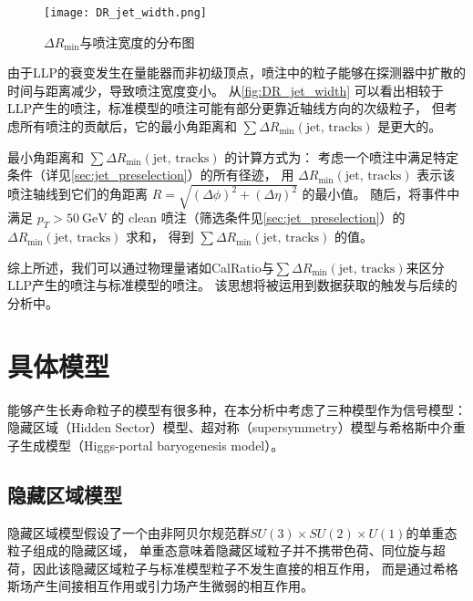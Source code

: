 \begin{figure}[ht]
    \centering
    \texttt{[image: DR\_jet\_width.png]}
    \caption{$\Delta R_{\min}$与喷注宽度的分布图\cite{ATLAS:2022zhj}}
    \label{fig:DR_jet_width}
\end{figure}

由于LLP的衰变发生在量能器而非初级顶点，喷注中的粒子能够在探测器中扩散的时间与距离减少，导致喷注宽度变小。
从\autoref{fig:DR_jet_width} 可以看出相较于LLP产生的喷注，标准模型的喷注可能有部分更靠近轴线方向的次级粒子，
但考虑所有喷注的贡献后，它的最小角距离和 $\sum \Delta R_{\text{min}}(\text{jet, tracks})$ 是更大的。

最小角距离和 $\sum \Delta R_{\text{min}}(\text{jet, tracks})$ 的计算方式为：
考虑一个喷注中满足特定条件（详见\autoref{sec:jet_preselection}）的所有径迹，
用 $\Delta R_{\text{min}}(\text{jet, tracks})$ 表示该喷注轴线到它们的角距离
$R = \sqrt{(\Delta \phi)^2 + (\Delta \eta)^2}$ 的最小值。
随后，将事件中满足 \(p_T > 50~\text{GeV}\) 的 clean 喷注（筛选条件见\autoref{sec:jet_preselection}）的
\(\Delta R_{\text{min}}(\text{jet, tracks})\) 求和，
得到 \(\sum \Delta R_{\text{min}}(\text{jet, tracks})\) 的值。

综上所述，我们可以通过物理量诸如CalRatio与$\sum \Delta R_{\text{min}}(\text{jet, tracks})$来区分LLP产生的喷注与标准模型的喷注。
该思想将被运用到数据获取的触发与后续的分析中。


\section{具体模型}
能够产生长寿命粒子的模型有很多种，在本分析中考虑了三种模型作为信号模型：
隐藏区域（Hidden Sector）模型、超对称（supersymmetry）模型与希格斯中介重子生成模型（Higgs-portal baryogenesis model）。


\subsection{隐藏区域模型}
隐藏区域模型假设了一个由非阿贝尔规范群$SU(3)\times SU(2) \times U(1)$的单重态粒子组成的隐藏区域，
单重态意味着隐藏区域粒子并不携带色荷、同位旋与超荷，因此该隐藏区域粒子与标准模型粒子不发生直接的相互作用，
而是通过希格斯场产生间接相互作用或引力场产生微弱的相互作用。
\cite{hidden_sector}

